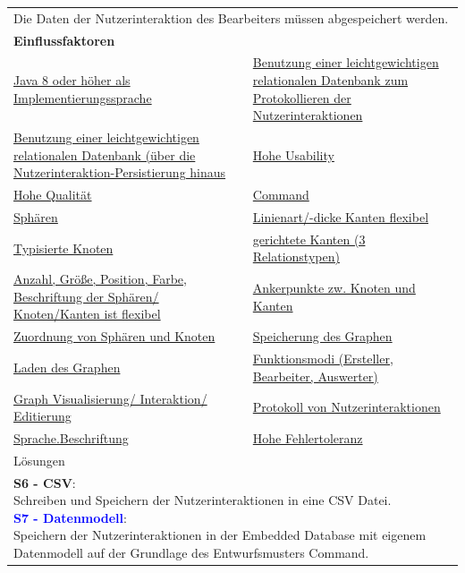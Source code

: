 \documentclass[enabledeprecatedfontcommands,fontsize=11pt,paper=a4,twoside]{scrartcl}
\newcounter{one}
\newcommand{\cb}[1]{{\textcolor{blue}{#1}}}
\begin{document}
\newpage
\hspace{-0.65cm}
\begin{tabular} {|p{8cm} p{8cm}|}
	\hline
	\rowcolor{prob}\multicolumn{2}{|l|}{\parbox{16cm}{\textbf{03: Datensicherung/Persistenz der Nutzerinteraktionen}}} \\  \hline\hline 
	\multicolumn{2}{|l|}{\parbox{16cm}{Die Daten der Nutzerinteraktion des Bearbeiters müssen abgespeichert werden.}}\rule{0pt}{1ex}\\  \hline
	\multicolumn{2}{|l|}{\textbf{Einflussfaktoren}}\\
	\hyperlink{b}{Java 8 oder höher als Implementierungssprache}  & 
	\hyperlink {d}{Benutzung einer leichtgewichtigen relationalen Datenbank zum Protokollieren der Nutzerinteraktionen}\\ 
	\hyperlink {e}{Benutzung einer leichtgewichtigen relationalen Datenbank (über die Nutzerinteraktion-Persistierung hinaus} & 
	\hyperlink {g}{Hohe Usability}\\
	\hyperlink {h}{Hohe Qualität} &
	\hyperlink {i}{Command} \\
	\hyperlink {n}{Sphären} &
	\hyperlink {o}{Linienart/-dicke Kanten flexibel} \\
	\hyperlink {p}{Typisierte Knoten} &
	\hyperlink {q}{gerichtete Kanten (3 Relationstypen)} \\
	\hyperlink {r}{Anzahl, Größe, Position, Farbe, Beschriftung der Sphären/ Knoten/Kanten ist flexibel} &
	\hyperlink {s}{Ankerpunkte zw. Knoten und Kanten} \\
	\hyperlink {t}{Zuordnung von Sphären und Knoten} &
	\hyperlink {v}{Speicherung des Graphen} \\
	\hyperlink {w}{Laden des Graphen} &
	\hyperlink {z}{Funktionsmodi (Ersteller, Bearbeiter, Auswerter)} \\
	\hyperlink {aa}{Graph Visualisierung/ Interaktion/ Editierung} &
	\hyperlink {bb}{Protokoll von Nutzerinteraktionen} \\
	\hyperlink {hh}{Sprache.Beschriftung} &
	\hyperlink {tt}{Hohe Fehlertoleranz} 
	\\ \hline
	\multicolumn{2}{|l|}{Lösungen} \\
	\multicolumn{2}{|l|}{\parbox{16cm}{
			\textbf{S6 - CSV}: \\
			Schreiben und Speichern der Nutzerinteraktionen in eine CSV Datei. \\
			\textbf{\cb{\hypertarget{aaa}{S7 - Datenmodell}}}: \\
			Speichern der Nutzerinteraktionen in der Embedded Database mit eigenem Datenmodell auf der Grundlage des Entwurfsmusters Command.}}\\ [6ex]
	\hline
\end{tabular}\\ \\ \\
\end{document}
